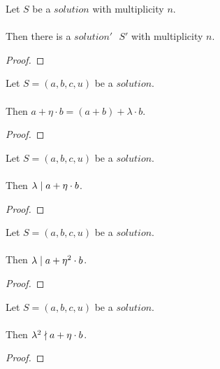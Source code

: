 \begin{lemma}
    \label{lmm:exists_Solution_of_Solution1}
    \leanok
    Let $S$ be a $solution$ with multiplicity $n$.\\\\
    Then there is a $solution'\text{ }S'$ with multiplicity $n$.
\end{lemma}
\begin{proof}
    \leanok
\end{proof}

\begin{lemma}
    \label{lmm:a_add_eta_b}
    \leanok
    Let $S=(a, b, c, u)$ be a $solution$.\\\\
    Then $a + \eta \cdot b = (a + b) + \lambda \cdot b$.
\end{lemma}
\begin{proof}
    \leanok
\end{proof}

\begin{lemma}
    \label{lmm:lambda_dvd_a_add_eta_mul_b}
    \leanok
    Let $S=(a, b, c, u)$ be a $solution$.\\\\
    Then $\lambda \mid a + \eta \cdot b$.
\end{lemma}
\begin{proof}
    \leanok
\end{proof}

\begin{lemma}
    \label{lmm:lambda_dvd_a_add_eta_sq_mul_b}
    \leanok
    Let $S=(a, b, c, u)$ be a $solution$.\\\\
    Then $\lambda \mid a + \eta^2 \cdot b$.
\end{lemma}
\begin{proof}
    \leanok
\end{proof}

\begin{lemma}
    \label{lmm:lambda_sq_not_a_add_eta_mul_b}
    \leanok
    Let $S=(a, b, c, u)$ be a $solution$.\\\\
    Then $\lambda^2 \nmid a + \eta \cdot b$.
\end{lemma}
\begin{proof}
    \leanok
\end{proof}

